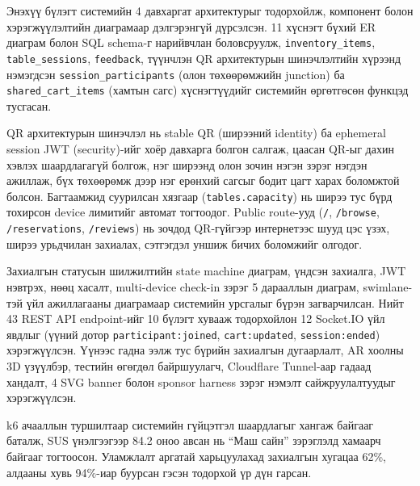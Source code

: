 Энэхүү бүлэгт системийн 4 давхаргат архитектурыг тодорхойлж, компонент болон
хэрэгжүүлэлтийн диаграмаар дэлгэрэнгүй дүрсэлсэн. 11 хүснэгт бүхий ER диаграм
болон SQL schema-г нарийвчлан боловсруулж, \texttt{inventory\_items},
\texttt{table\_sessions}, \texttt{feedback}, түүнчлэн QR архитектурын
шинэчлэлтийн хүрээнд нэмэгдсэн \texttt{session\_participants} (олон төхөөрөмжийн
junction) ба \texttt{shared\_cart\_items} (хамтын сагс) хүснэгтүүдийг
системийн өргөтгөсөн функцэд тусгасан.

QR архитектурын шинэчлэл нь stable QR (ширээний identity) ба ephemeral session
JWT (security)-ийг хоёр давхарга болгон салгаж, цаасан QR-ыг дахин хэвлэх
шаардлагагүй болгож, нэг ширээнд олон зочин нэгэн зэрэг нэгдэн ажиллаж, бүх
төхөөрөмж дээр нэг ерөнхий сагсыг бодит цагт харах боломжтой болсон. Багтаамжид
суурилсан хязгаар (\texttt{tables.capacity}) нь ширээ тус бүрд тохирсон device
лимитийг автомат тогтоодог. Public route-ууд (\texttt{/}, \texttt{/browse},
\texttt{/reservations}, \texttt{/reviews}) нь зочдод QR-гүйгээр интернетээс
шууд цэс үзэх, ширээ урьдчилан захиалах, сэтгэгдэл уншиж бичих боломжийг
олгодог.

Захиалгын статусын шилжилтийн state machine диаграм, үндсэн захиалга, JWT
нэвтрэх, нөөц хасалт, multi-device check-in зэрэг 5 дарааллын диаграм,
swimlane-тэй үйл ажиллагааны диаграмаар системийн урсгалыг бүрэн загварчилсан.
Нийт 43 REST API endpoint-ийг 10 бүлэгт хувааж тодорхойлон 12 Socket.IO үйл
явдлыг (үүний дотор \texttt{participant:joined}, \texttt{cart:updated},
\texttt{session:ended}) хэрэгжүүлсэн. Үүнээс гадна ээлж тус бүрийн захиалгын
дугаарлалт, AR хоолны 3D үзүүлбэр, тестийн өгөгдөл байршуулагч,
Cloudflare Tunnel-аар гадаад хандалт, 4 SVG banner болон sponsor harness зэрэг
нэмэлт сайжруулалтуудыг хэрэгжүүлсэн.

k6 ачааллын туршилтаар системийн гүйцэтгэл шаардлагыг хангаж байгааг баталж,
SUS үнэлгээгээр 84.2 оноо авсан нь ``Маш сайн'' зэрэглэлд хамаарч байгааг
тогтоосон. Уламжлалт аргатай харьцуулахад захиалгын хугацаа 62\%, алдааны хувь
94\%-иар буурсан гэсэн тодорхой үр дүн гарсан.

